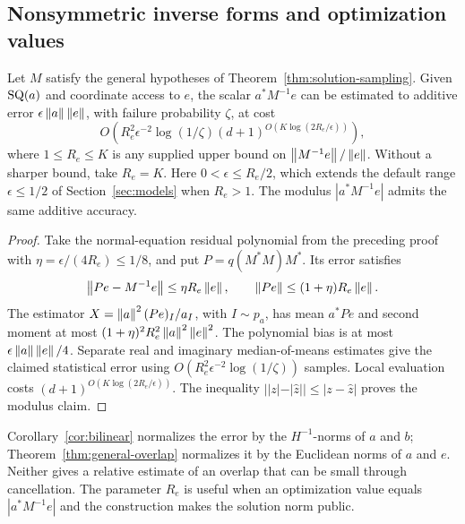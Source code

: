 \subsection{Nonsymmetric inverse forms and optimization values}
\begin{theorem}\label{thm:general-overlap}
Let $M$ satisfy the general hypotheses of Theorem~\ref{thm:solution-sampling}.
Given $\mathrm{SQ}(a)$ and coordinate access to $e$, the scalar $a^*M^{-1}e$ can be
estimated to additive error $\epsilon\left\lVert a\right\rVert\left\lVert e\right\rVert$, with failure
probability $\zeta$, at cost
\begin{equation}\label{eq:general-overlap}
 O\!\left(R_e^2\epsilon^{-2}\log(1/\zeta)
 (d+1)^{O(K\log(2R_e/\epsilon))}\right),
\end{equation}
where $1\leq R_e\leq K$ is any supplied upper bound on
$\left\lVert M^{-1}e\right\rVert/\left\lVert e\right\rVert$. Without a sharper bound, take $R_e=K$.
Here $0<\epsilon\leq R_e/2$, which extends the default range
$\epsilon\leq1/2$ of Section~\ref{sec:models} when $R_e>1$.
The modulus $|a^*M^{-1}e|$ admits the same additive accuracy.
\end{theorem}
\begin{proof}
Take the normal-equation residual polynomial from the preceding proof with
$\eta=\epsilon/(4R_e)\leq1/8$, and put $P=q(M^*M)M^*$.
Its error satisfies
\[
 \left\lVert Pe-M^{-1}e\right\rVert\leq\eta R_e\left\lVert e\right\rVert,\qquad
 \left\lVert Pe\right\rVert\leq(1+\eta)R_e\left\lVert e\right\rVert.
\]
The estimator $X=\left\lVert a\right\rVert^2(Pe)_I/a_I$, with $I\sim p_a$, has mean
$a^*Pe$ and second moment at most
$(1+\eta)^2R_e^2\left\lVert a\right\rVert^2\left\lVert e\right\rVert^2$. The polynomial bias is at most
$\epsilon\left\lVert a\right\rVert\left\lVert e\right\rVert/4$. Separate real and imaginary median-of-means
estimates give the claimed statistical error using
$O(R_e^2\epsilon^{-2}\log(1/\zeta))$ samples. Local evaluation costs
$(d+1)^{O(K\log(2R_e/\epsilon))}$. The inequality
$||z|-|\widehat z||\leq|z-\widehat z|$ proves the modulus claim.
\end{proof}
Corollary~\ref{cor:bilinear} normalizes the error by the
$H^{-1}$-norms of $a$ and $b$; Theorem~\ref{thm:general-overlap}
normalizes it by the Euclidean norms of $a$ and $e$. Neither gives a
relative estimate of an overlap that can be small through cancellation.
The parameter $R_e$ is useful when an optimization value equals
$|a^*M^{-1}e|$ and the construction makes the solution norm public.

